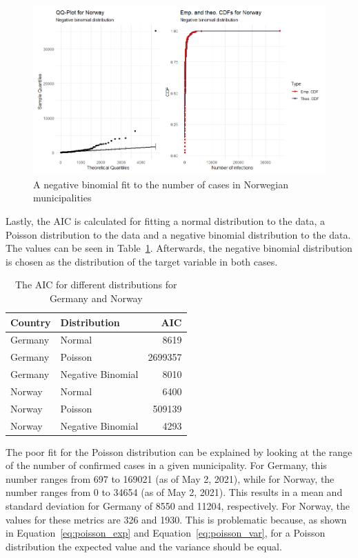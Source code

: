 \begin{figure}[H]
  \centering
  \includegraphics[width = \textwidth]{fit_nbinom_norway.png}
  \caption{A negative binomial fit to the number of cases in Norwegian municipalities}
  \label{fitNegbinomNorway}
\end{figure}
Lastly, the AIC is calculated for fitting a normal distribution to the data, a Poisson distribution to the data and a negative binomial distribution to the data. The values can be seen in Table~\ref{aic}. Afterwards, the negative binomial distribution is chosen as the distribution of the target variable in both cases. \\
\begin{table}[H] 
\caption{The AIC for different distributions for Germany and Norway \label{aic}}
\begin{tabular}{l l r}
\toprule
\textbf{Country}	& \textbf{Distribution}	& \textbf{AIC} \\
\midrule
Germany & Normal & 8619 \\
Germany & Poisson & 2699357 \\
Germany & Negative Binomial & 8010 \\
Norway & Normal & 6400 \\
Norway & Poisson & 509139 \\
Norway & Negative Binomial & 4293 \\
\bottomrule
\end{tabular}
\end{table} 
The poor fit for the Poisson distribution can be explained by looking at the range of the number of confirmed cases in a given municipality. For Germany, this number ranges from 697 to 169021 (as of May 2, 2021), while for Norway, the number ranges from 0 to 34654 (as of May 2, 2021). This results in a mean and standard deviation for Germany of 8550 and 11204, respectively. For Norway, the values for these metrics are 326 and 1930. This is problematic because, as shown in Equation~\ref{eq:poisson_exp} and Equation~\ref{eq:poisson_var}, for a Poisson distribution the expected value and the variance should be equal. \\
